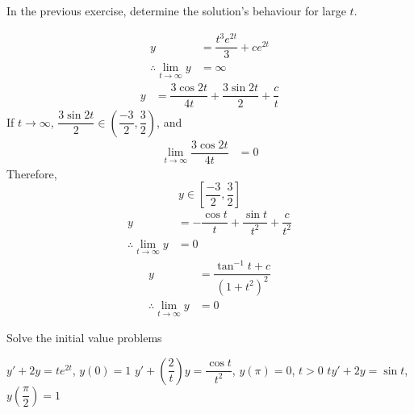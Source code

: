 \documentclass[fleqn, a4paper, 12pt, oneside]{amsart}
\theoremstyle{definition}
\theoremstyle{theorem}
\begin{document}
\begin{question}
	In the previous exercise, determine the solution's behaviour for large $t$.
\end{question}

\begin{solution}
	\begin{tasks}
		\task 
			\begin{align*}
				y &= \dfrac{t^3 e^{2t}}{3} + c e^{2t}\\
				\therefore \lim\limits_{t \to \infty} y &= \infty
			\end{align*}
		\task
			\begin{align*}
				y &= \dfrac{3 \cos 2t}{4 t} + \dfrac{3 \sin 2t}{2} + \dfrac{c}{t}
			\end{align*}
			If $t \to \infty$, $\dfrac{3 \sin 2t}{2} \in \left( \dfrac{-3}{2} , \dfrac{3}{2} \right)$, and
			\begin{align*}
				\lim\limits_{t \to \infty} \dfrac{3 \cos 2t}{4t} &= 0
			\end{align*}
			Therefore,
			\begin{equation*}
				y \in \left[ \dfrac{-3}{2} , \dfrac{3}{2} \right]
			\end{equation*}
		\task
			\begin{align*}
				y &= -\dfrac{\cos t}{t} + \dfrac{\sin t}{t^2} + \dfrac{c}{t^2}\\
				\therefore \lim\limits_{t \to \infty} y &= 0
			\end{align*}
		\task 
			\begin{align*}
				y &= \dfrac{\tan^{-1} t + c}{(1 + t^2)^2}\\
				\therefore \lim\limits_{t \to \infty} y &= 0
			\end{align*}
	\end{tasks}
\end{solution}

\begin{question}
	Solve the initial value problems
	\begin{tasks}
		\task $y' + 2y = t e^{2t}$, $y(0) = 1$
		\task $y' + \left( \dfrac{2}{t} \right) y = \dfrac{\cos t}{t^2}$, $y(\pi) = 0$, $t > 0$
		\task $t y' + 2y = \sin t$, $y \left( \dfrac{\pi}{2} \right) = 1$
	\end{tasks}
\end{question}
\end{document}
